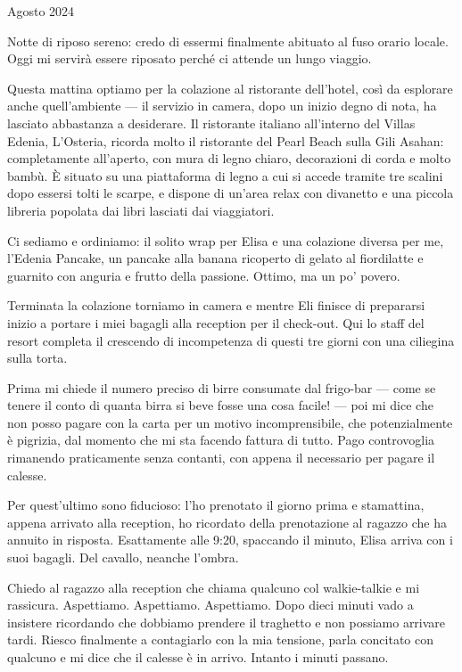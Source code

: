  Agosto 2024 \newline

Notte di riposo sereno: credo di essermi finalmente abituato al fuso orario locale. Oggi mi servirà essere riposato perché ci attende un lungo viaggio.

Questa mattina optiamo per la colazione al ristorante dell'hotel, così da esplorare anche quell'ambiente — il servizio in camera, dopo un inizio degno di nota, ha lasciato abbastanza a desiderare. Il ristorante italiano all'interno del Villas Edenia, L'Osteria, ricorda molto il ristorante del Pearl Beach sulla Gili Asahan: completamente all'aperto, con mura di legno chiaro, decorazioni di corda e molto bambù. È situato su una piattaforma di legno a cui si accede tramite tre scalini dopo essersi tolti le scarpe, e dispone di un'area relax con divanetto e una piccola libreria popolata dai libri lasciati dai viaggiatori.

Ci sediamo e ordiniamo: il solito wrap per Elisa e una colazione diversa per me, l'Edenia Pancake, un pancake alla banana ricoperto di gelato al fiordilatte e guarnito con anguria e frutto della passione. Ottimo, ma un po' povero.

Terminata la colazione torniamo in camera e mentre Eli finisce di prepararsi inizio a portare i miei bagagli alla reception per il check-out. Qui lo staff del resort completa il crescendo di incompetenza di questi tre giorni con una ciliegina sulla torta.

Prima mi chiede il numero preciso di birre consumate dal frigo-bar — come se tenere il conto di quanta birra si beve fosse una cosa facile! — poi mi dice che non posso pagare con la carta per un motivo incomprensibile, che potenzialmente è pigrizia, dal momento che mi sta facendo fattura di tutto. Pago controvoglia rimanendo praticamente senza contanti, con appena il necessario per pagare il calesse.

Per quest'ultimo sono fiducioso: l'ho prenotato il giorno prima e stamattina, appena arrivato alla reception, ho ricordato della prenotazione al ragazzo che ha annuito in risposta. Esattamente alle 9:20, spaccando il minuto, Elisa arriva con i suoi bagagli. Del cavallo, neanche l'ombra.

Chiedo al ragazzo alla reception che chiama qualcuno col walkie-talkie e mi rassicura. Aspettiamo. Aspettiamo. Aspettiamo. Dopo dieci minuti vado a insistere ricordando che dobbiamo prendere il traghetto e non possiamo arrivare tardi. Riesco finalmente a contagiarlo con la mia tensione, parla concitato con qualcuno e mi dice che il calesse è in arrivo. Intanto i minuti passano.

